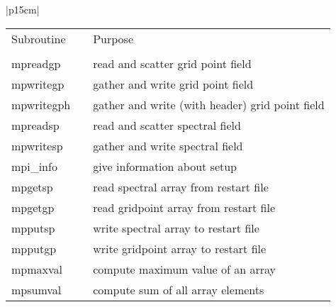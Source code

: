 \begin{center}
\begin{tabular}{|p{15cm}|}
\hline
\begin{center}
\begin{tabular}{l p{2cm} l}
Subroutine & &Purpose \\
&& \\
{\sub mpreadgp}& & read and scatter grid point field \\
{\sub mpwritegp}& & gather and write grid point field \\
{\sub mpwritegph} && gather and write (with header) grid point field \\
{\sub mpreadsp} & &read and scatter spectral field \\
{\sub mpwritesp} &&gather and write spectral field \\
{\sub mpi\_info} && give information about setup \\
{\sub mpgetsp}   && read spectral array from restart file \\
{\sub mpgetgp}   && read gridpoint array from restart file \\
{\sub mpputsp}   && write spectral array to restart file \\
{\sub mpputgp}   && write gridpoint array to restart file \\
{\sub mpmaxval}  && compute maximum value of an array \\
{\sub mpsumval}  && compute sum of all array elements \\
\end{tabular}
\end{center}

\vspace{3mm} \\

\hline
\end{tabular}
\end{center}
\newpage
